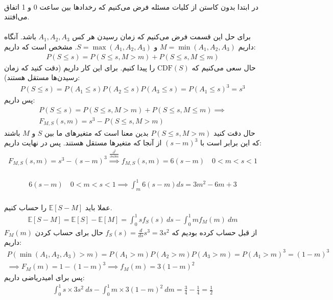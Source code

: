 \\
در ابتدا بدون کاستن از کلیات مسئله فرض می‌کنیم که رخداد‌ها بین ساعت 0 و 1 اتفاق می‌افتند.
\\\\
برای حل این قسمت فرض می‌کنیم که زمان رسیدن هر کس
$A_1, A_2, A_3$
باشد. آنگاه داریم
$M = \min(A_1, A_2, A_3)$ و $S = \max(A_1, A_2, A_3)$.
مشخص است که داریم:
\begin{gather*}
    P(S \leq s) = P(S \leq s, M > m) + P(S \leq s, M \leq m)
\end{gather*}
حال سعی می‌کنیم که
$\text{CDF}(S)$
را پیدا کنیم. برای این کار داریم
(دقت کنید که زمان رسیدن‌ها مستقل هستند):
\begin{gather*}
    P(S \le s) = P(A_1 \le s)P(A_2 \le s)P(A_3 \le s) = P(A_1 \le s)^3 = s^3
\end{gather*}
پس داریم:
\begin{gather*}
    P(S \leq s) = P(S \leq s, M > m) + P(S \leq s, M \leq m) \implies\\
    F_{M,S}(s, m) = s^3 - P(S \leq s, M > m)
\end{gather*}
حال دقت کنید
$P(S \leq s, M > m)$
بدین معنا است که متغیر‌های ما بین
$S$ و $M$
باشند که این برابر است با
$(s-m)^3$
از آنجا که متغیر‌ها مستقل هستند.
پس در نهایت داریم:
\begin{gather*}
    F_{M,S}(s, m) = s^3 - (s-m)^3 \stackrel{\frac{\partial^2}{\partial s \partial m}}{\implies}
    f_{M,S}(s, m) = 6(s-m) \quad 0 < m < s < 1
\end{gather*}
\\
\begin{gather*}
    6(s-m) \quad 0 < m < s < 1 \implies \int_m^1 6(s-m) ds = 3m^2 - 6m + 3
\end{gather*}
\\
عملا باید
$\mathbb{E} [S - M]$
را حساب کنیم.
\begin{gather*}
    \mathbb{E} [S - M] = \mathbb{E} [S] - \mathbb{E} [M] = \int_0^1 s f_S(s) ~ ds - \int_0^1 m f_M(m) ~ dm
\end{gather*}
از قبل حساب کرده بودیم که
$f_S(s) = \frac{d}{ds} s^3 = 3s^2$
حال برای حساب کردن
$F_M(m)$
داریم:
\begin{gather*}
    P(\min(A_1, A_2, A_3) > m) = P(A_1 > m)P(A_2 > m)P(A_3 > m) = P(A_1 > m)^3 = (1 - m)^3\\
    \implies F_M(m) = 1 - (1 - m)^3 \implies f_M(m) = 3(1-m)^2
\end{gather*}
پس برای امیدریاضی داریم:
\begin{gather*}
    \int_0^1 s \times 3s^2 ~ ds - \int_0^1 m \times 3(1-m)^2 ~ dm
    = \frac{3}{4} - \frac{1}{4} = \frac{1}{2}
\end{gather*}